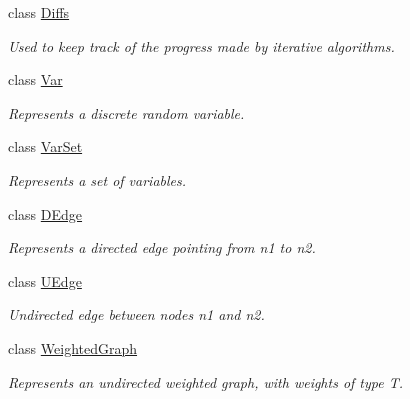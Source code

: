 \begin{CompactItemize}
class \hyperlink{classdai_1_1Diffs}{Diffs}
\begin{CompactList}\small\item\em Used to keep track of the progress made by iterative algorithms. \item\end{CompactList}\item 
class \hyperlink{classdai_1_1Var}{Var}
\begin{CompactList}\small\item\em Represents a discrete random variable. \item\end{CompactList}\item 
class \hyperlink{classdai_1_1VarSet}{VarSet}
\begin{CompactList}\small\item\em Represents a set of variables. \item\end{CompactList}\item 
class \hyperlink{classdai_1_1DEdge}{DEdge}
\begin{CompactList}\small\item\em Represents a directed edge pointing from n1 to n2. \item\end{CompactList}\item 
class \hyperlink{classdai_1_1UEdge}{UEdge}
\begin{CompactList}\small\item\em Undirected edge between nodes n1 and n2. \item\end{CompactList}\item 
class \hyperlink{classdai_1_1WeightedGraph}{WeightedGraph}
\begin{CompactList}\small\item\em Represents an undirected weighted graph, with weights of type T. \item\end{CompactList}\end{CompactItemize}
